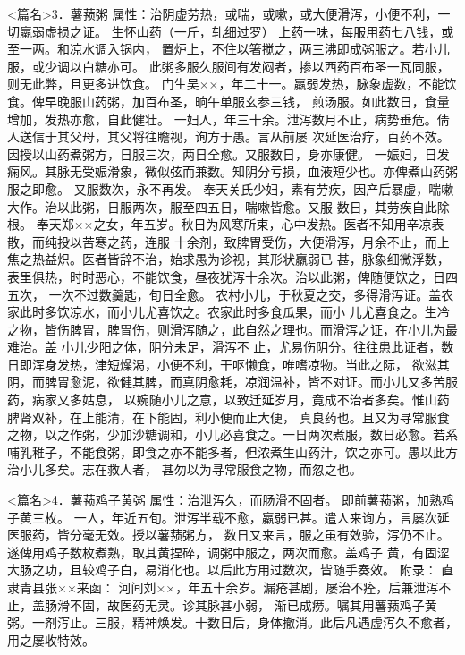 \documentclass[a4paper,12pt,UTF8,twoside]{ctexbook}
\begin{document}
<篇名>3．薯蓣粥
属性：治阴虚劳热，或喘，或嗽，或大便滑泻，小便不利，一切羸弱虚损之证。 
生怀山药（一斤，轧细过罗） 
上药一味，每服用药七八钱，或至一两。和凉水调入锅内， 
置炉上，不住以箸搅之，两三沸即成粥服之。若小儿服，或少调以白糖亦可。 
此粥多服久服间有发闷者，掺以西药百布圣一瓦同服，则无此弊，且更多进饮食。 
门生吴××，年二十一。羸弱发热，脉象虚数，不能饮食。俾早晚服山药粥，加百布圣，晌午单服玄参三钱， 
煎汤服。如此数日，食量增加，发热亦愈，自此健壮。 
一妇人，年三十余。泄泻数月不止，病势垂危。倩人送信于其父母，其父将往瞻视，询方于愚。言从前屡 
次延医治疗，百药不效。因授以山药煮粥方，日服三次，两日全愈。又服数日，身亦康健。 
一娠妇，日发痫风。其脉无受娠滑象，微似弦而兼数。知阴分亏损，血液短少也。亦俾煮山药粥服之即愈。 
又服数次，永不再发。 
奉天关氏少妇，素有劳疾，因产后暴虚，喘嗽大作。治以此粥，日服两次，服至四五日，喘嗽皆愈。又服 
数日，其劳疾自此除根。 
奉天郑××之女，年五岁。秋日为风寒所束，心中发热。医者不知用辛凉表散，而纯投以苦寒之药，连服 
十余剂，致脾胃受伤，大便滑泻，月余不止，而上焦之热益炽。医者皆辞不治，始求愚为诊视，其形状羸弱已 
甚，脉象细微浮数，表里俱热，时时恶心，不能饮食，昼夜犹泻十余次。治以此粥，俾随便饮之，日四五次， 
一次不过数羹匙，旬日全愈。 
农村小儿，于秋夏之交，多得滑泻证。盖农家此时多饮凉水，而小儿尤喜饮之。农家此时多食瓜果，而小 
儿尤喜食之。生冷之物，皆伤脾胃，脾胃伤，则滑泻随之，此自然之理也。而滑泻之证，在小儿为最难治。盖 
小儿少阳之体，阴分未足，滑泻不 
止，尤易伤阴分。往往患此证者，数日即浑身发热，津短燥渴，小便不利，干呕懒食，唯嗜凉物。当此之际， 
欲滋其阴，而脾胃愈泥，欲健其脾，而真阴愈耗，凉润温补，皆不对证。而小儿又多苦服药，病家又多姑息， 
以婉随小儿之意，以致迁延岁月，竟成不治者多矣。惟山药脾肾双补，在上能清，在下能固，利小便而止大便， 
真良药也。且又为寻常服食之物，以之作粥，少加沙糖调和，小儿必喜食之。一日两次煮服，数日必愈。若系 
哺乳稚子，不能食粥，即食之亦不能多者，但浓煮生山药汁，饮之亦可。愚以此方治小儿多矣。志在救人者， 
甚勿以为寻常服食之物，而忽之也。 


<篇名>4．薯蓣鸡子黄粥
属性：治泄泻久，而肠滑不固者。 
即前薯蓣粥，加熟鸡子黄三枚。 
一人，年近五旬。泄泻半载不愈，羸弱已甚。遣人来询方，言屡次延医服药，皆分毫无效。授以薯蓣粥方， 
数日又来言，服之虽有效验，泻仍不止。遂俾用鸡子数枚煮熟，取其黄捏碎，调粥中服之，两次而愈。盖鸡子 
黄，有固涩大肠之功，且较鸡子白，易消化也。以后此方用过数次，皆随手奏效。 
附录∶ 
直隶青县张××来函∶ 
河间刘××，年五十余岁。漏疮甚剧，屡治不痊，后兼泄泻不止，盖肠滑不固，故医药无灵。诊其脉甚小弱， 
渐已成痨。嘱其用薯蓣鸡子黄粥。一剂泻止。三服，精神焕发。十数日后，身体撤消。此后凡遇虚泻久不愈者， 
用之屡收特效。 
\end{document}
